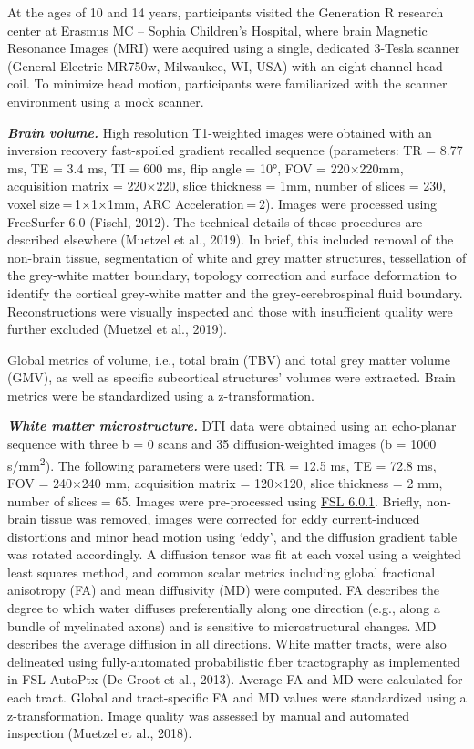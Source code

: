 \documentclass[
  letterpaper,
  DIV=11,
  numbers=noendperiod]{scrreport}
\begin{document}
At the ages of 10 and 14 years, participants visited the Generation R
research center at Erasmus MC -- Sophia Children's Hospital, where brain
Magnetic Resonance Images (MRI) were acquired using a single, dedicated
3-Tesla scanner (General Electric MR750w, Milwaukee, WI, USA) with an
eight-channel head coil. To minimize head motion, participants were
familiarized with the scanner environment using a mock scanner.

\textbf{\emph{Brain volume.}} High resolution T1-weighted images were
obtained with an inversion recovery fast-spoiled gradient recalled
sequence (parameters: TR = 8.77 ms, TE = 3.4 ms, TI = 600 ms, flip angle
= 10°, FOV = 220×220mm, acquisition matrix = 220×220, slice thickness =
1mm, number of slices = 230, voxel size = 1×1×1mm, ARC
Acceleration = 2). Images were processed using FreeSurfer 6.0 (Fischl,
2012). The technical details of these procedures are described elsewhere
(Muetzel et al., 2019). In brief, this included removal of the non-brain
tissue, segmentation of white and grey matter structures, tessellation
of the grey-white matter boundary, topology correction and surface
deformation to identify the cortical grey-white matter and the
grey-cerebrospinal fluid boundary. Reconstructions were visually
inspected and those with insufficient quality were further excluded
(Muetzel et al., 2019).

Global metrics of volume, i.e., total brain (TBV) and total grey matter
volume (GMV), as well as specific subcortical structures' volumes were
extracted. Brain metrics were be standardized using a z-transformation.

\textbf{\emph{White matter microstructure.}} DTI data were obtained
using an echo-planar sequence with three b = 0 scans and 35
diffusion-weighted images (b = 1000 s/mm\textsuperscript{2}). The
following parameters were used: TR = 12.5 ms, TE = 72.8 ms, FOV =
240×240 mm, acquisition matrix = 120×120, slice thickness = 2 mm, number
of slices = 65. Images were pre-processed using
\href{https://fsl.fmrib.ox.ac.uk/fsl/}{FSL 6.0.1}. Briefly, non-brain
tissue was removed, images were corrected for eddy current-induced
distortions and minor head motion using `eddy', and the diffusion
gradient table was rotated accordingly. A diffusion tensor was fit at
each voxel using a weighted least squares method, and common scalar
metrics including global fractional anisotropy (FA) and mean diffusivity
(MD) were computed. FA describes the degree to which water diffuses
preferentially along one direction (e.g., along a bundle of myelinated
axons) and is sensitive to microstructural changes. MD describes the
average diffusion in all directions. White matter tracts, were also
delineated using fully-automated probabilistic fiber tractography as
implemented in FSL AutoPtx (De Groot et al., 2013). Average FA and MD
were calculated for each tract. Global and tract-specific FA and MD
values were standardized using a z-transformation. Image quality was
assessed by manual and automated inspection (Muetzel et al., 2018).
\end{document}

